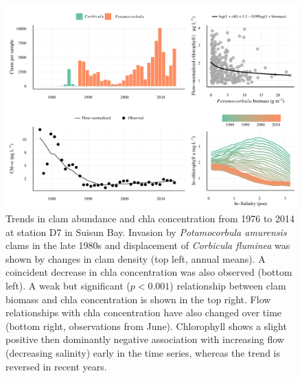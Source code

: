 \documentclass[letterpaper,12pt,oneside]{article}\usepackage[]{graphicx}\usepackage[]{color}
\begin{document}
\begin{figure}[!ht]

{\centering \includegraphics[width=\textwidth]{figs/clmchl-1} 

}

\caption{Trends in clam abundance and \ac{chla} concentration from 1976 to 2014 at station D7 in Suisun Bay.  Invasion by \textit{Potamocorbula amurensis} clams in the late 1980s and displacement of \textit{Corbicula fluminea} was shown by changes in clam density (top left, annual means).  A coincident decrease in \ac{chla} concentration was also observed (bottom left).  A weak but significant ($p < 0.001$) relationship between clam biomass and \ac{chla} concentration is shown in the top right.  Flow relationships with \ac{chla} concentration have also changed over time (bottom right, observations from June). Chlorophyll shows a slight positive then dominantly negative association with increasing flow (decreasing salinity) early in the time series, whereas the trend is reversed in recent years.}\label{fig:clmchl}
\end{figure}



\clearpage
\end{document}
